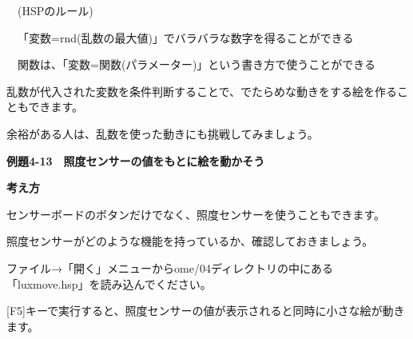 \documentclass[a4paper,dvipdfmx]{jarticle}
\newcommand\textstyleqwerty[1]{#1}
\begin{document}
\bigskip


\bigskip


\bigskip


\bigskip


\bigskip


\bigskip


\bigskip


\bigskip


\bigskip


\bigskip


\bigskip


\bigskip


\bigskip

\ \ (HSPのルール)


\bigskip

\ \ 「変数=rnd(乱数の最大値)」でバラバラな数字を得ることができる

\ \ 関数は、「変数=関数(パラメーター)」という書き方で使うことができる


\bigskip

乱数が代入された変数を条件判断することで、でたらめな動きをする絵を作ることもできます。

余裕がある人は、乱数を使った動きにも挑戦してみましょう。


\bigskip


\bigskip


\bigskip


\bigskip


\bigskip

\clearpage
\textstyleqwerty{\textbf{例題4-13　照度センサーの値をもとに絵を動かそう}}


\bigskip

{\bfseries
考え方}


\bigskip

センサーボードのボタンだけでなく、照度センサーを使うこともできます。

照度センサーがどのような機能を持っているか、確認しておきましょう。


\bigskip

ファイル→「開く」メニューからome/04ディレクトリの中にある「luxmove.hsp」を読み込んでください。

[F5]キーで実行すると、照度センサーの値が表示されると同時に小さな絵が動きます。


\bigskip
\end{document}
